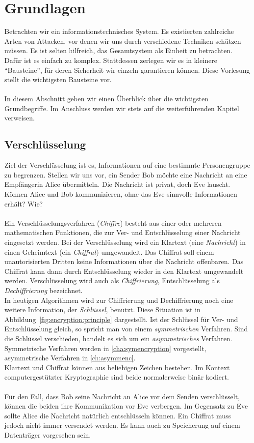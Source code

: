 \section{Grundlagen}
Betrachten wir ein informationstechnisches System. Es existierten zahlreiche Arten von Attacken, vor denen wir uns durch verschiedene Techniken schützen müssen. Es ist selten hilfreich, das Gesamtsystem als Einheit zu betrachten. Dafür ist es einfach zu komplex. Stattdessen zerlegen wir es in kleinere "`Bausteine"', für deren Sicherheit wir einzeln garantieren können. Diese Vorlesung stellt die wichtigsten Bausteine vor.\\ \ \\
In diesem Abschnitt geben wir einen Überblick über die wichtigsten Grundbegriffe. Im Anschluss werden wir stets auf die weiterführenden Kapitel verweisen.

\subsection{Verschlüsselung}

Ziel der Verschlüsselung ist es, Informationen auf eine bestimmte Personengruppe zu begrenzen. Stellen wir uns vor, ein Sender Bob möchte eine Nachricht an eine Empfängerin Alice übermitteln. Die Nachricht ist privat, doch Eve lauscht. Können Alice und Bob kommunizieren, ohne das Eve sinnvolle Informationen erhält? Wie?\\ \ \\
Ein Verschlüsselungsverfahren (\emph{Chiffre}) besteht aus einer oder mehreren mathematischen Funktionen, die zur Ver- und Entschlüsselung einer Nachricht eingesetzt werden. Bei der Verschlüsselung wird ein Klartext (eine \emph{Nachricht}) in einen Geheimtext (ein \emph{Chiffrat}) umgewandelt. Das Chiffrat soll einem unautorisierten Dritten keine Informationen über die Nachricht offenbaren. Das Chiffrat kann dann durch Entschlüsselung wieder in den Klartext umgewandelt werden. Verschlüsselung wird auch als \emph{Chiffrierung}, Entschlüsselung als \emph{Dechiffrierung} bezeichnet.\\
In heutigen Algorithmen wird zur Chiffrierung und Dechiffrierung noch eine weitere Information, der \emph{Schlüssel}, benutzt. Diese Situation ist in Abbildung~\ref{fig:encryption:principle} dargestellt. Ist der Schlüssel für Ver- und Entschlüsselung gleich, so spricht man von einem \emph{symmetrischen} Verfahren. Sind die Schlüssel verschieden, handelt es sich um ein \emph{asymmetrisches} Verfahren. Symmetrische Verfahren werden in \autoref{cha:symencryption} vorgestellt, asymmetrische Verfahren in \autoref{ch:asymmenc}.\\
Klartext und Chiffrat können aus beliebigen Zeichen bestehen. Im Kontext computergestützter Kryptographie sind beide normalerweise binär kodiert.\\ \ \\
Für den Fall, dass Bob seine Nachricht an Alice vor dem Senden verschlüsselt, können die beiden ihre Kommunikation vor Eve verbergen. Im Gegensatz zu Eve sollte Alice die Nachricht natürlich entschlüsseln können. Ein Chiffrat muss jedoch nicht immer versendet werden. Es kann auch zu Speicherung auf einem Datenträger vorgesehen sein.

